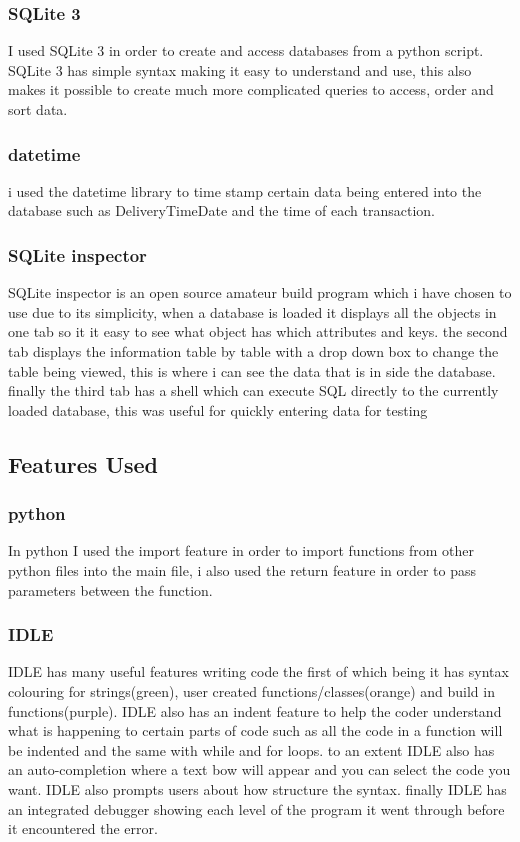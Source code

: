 \subsubsection{SQLite 3}
I used SQLite 3 in order to create and access databases from a python script. SQLite 3 has simple syntax making it easy to understand and use, this also makes it possible to create much more complicated queries to access, order and sort data.

\subsubsection{datetime}
i used the datetime library to time stamp certain data being entered into the database such as DeliveryTimeDate and the time of each transaction.

\subsubsection{SQLite inspector}
SQLite inspector is an open source amateur build program which i have chosen to use due to its simplicity, when a database is loaded it displays all the objects in one tab so it it easy to see what object has which attributes and keys. the second tab displays the information table by table with a drop down box to change the table being viewed, this is where i can see the data that is in side the database. finally the third tab has a shell which can execute SQL directly to the currently loaded database, this was useful for quickly entering data for testing

\subsection{Features Used}

\subsubsection{python}
In python I used the import feature in order to import functions from other python files into the main file, i also used the return feature in order to pass parameters between the function.

\subsubsection{IDLE}
IDLE has many useful features writing code the first of which being it has syntax colouring for strings(green), user created functions/classes(orange) and build in functions(purple). IDLE also has an indent feature to help the coder understand what is happening to certain parts of code such as all the code in a function will be indented and the same with while and for loops. to an extent IDLE also has an auto-completion where a text bow will appear and you can select the code you want. IDLE also prompts users about how structure the syntax. finally IDLE has an integrated debugger showing each level of the program it went through before it encountered the error.


